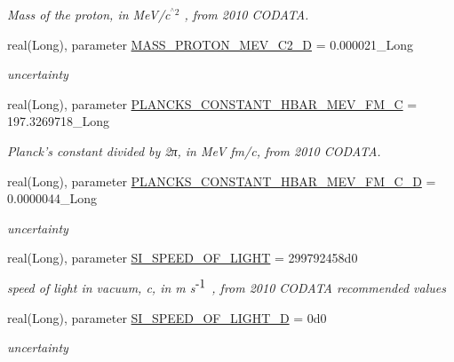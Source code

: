 \begin{DoxyCompactItemize}
\begin{DoxyCompactList}\small\item\em Mass of the proton, in MeV/c$^{\mbox{$^\wedge$2}}$ , from 2010 CODATA. \item\end{DoxyCompactList}\item 
real(Long), parameter \hyperlink{namespacephys__cons_a3299e2ce8c6c720ed740eff7968b27a8}{MASS\_\-PROTON\_\-MEV\_\-C2\_\-D} = 0.000021\_\-Long
\begin{DoxyCompactList}\small\item\em uncertainty \item\end{DoxyCompactList}\item 
real(Long), parameter \hyperlink{namespacephys__cons_aed64b5904d4665ea8272a82b187b78c9}{PLANCKS\_\-CONSTANT\_\-HBAR\_\-MEV\_\-FM\_\-C} = 197.3269718\_\-Long
\begin{DoxyCompactList}\small\item\em Planck's constant divided by 2π, in MeV fm/c, from 2010 CODATA. \item\end{DoxyCompactList}\item 
real(Long), parameter \hyperlink{namespacephys__cons_a62594785e48a010b70b6d8320dc50269}{PLANCKS\_\-CONSTANT\_\-HBAR\_\-MEV\_\-FM\_\-C\_\-D} = 0.0000044\_\-Long
\begin{DoxyCompactList}\small\item\em uncertainty \item\end{DoxyCompactList}\item 
real(Long), parameter \hyperlink{namespacephys__cons_ae265fad966cfc841f9a073a52955d742}{SI\_\-SPEED\_\-OF\_\-LIGHT} = 299792458d0
\begin{DoxyCompactList}\small\item\em speed of light in vacuum, c, in m s$^{\mbox{-\/1}}$ , from 2010 CODATA recommended values \item\end{DoxyCompactList}\item 
real(Long), parameter \hyperlink{namespacephys__cons_a5547546b06eb8853e52e304b25cc7596}{SI\_\-SPEED\_\-OF\_\-LIGHT\_\-D} = 0d0
\begin{DoxyCompactList}\small\item\em uncertainty \item\end{DoxyCompactList}\item 

\end{DoxyCompactItemize}
